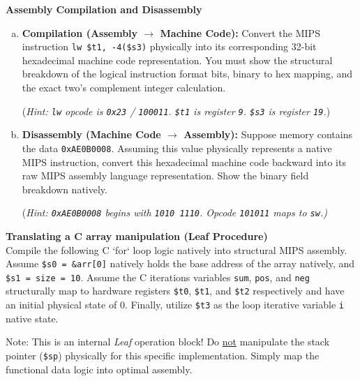 \documentclass[letterpaper]{report}
\begin{document}
%
 {\bf Assembly Compilation and Disassembly}
\begin{enumerate}[(a)]
    \item \textbf{Compilation (Assembly $\rightarrow$ Machine Code):} Convert the MIPS instruction \texttt{lw \$t1, -4(\$s3)} physically into its corresponding 32-bit hexadecimal machine code representation. You must show the structural breakdown of the logical instruction format bits, binary to hex mapping, and the exact two's complement integer calculation.
    
    (\textit{Hint: \texttt{lw} opcode is \texttt{0x23} / \texttt{100011}. \texttt{\$t1} is register \texttt{9}. \texttt{\$s3} is register \texttt{19}.})
    \vspace{4.0in}

    \item \textbf{Disassembly (Machine Code $\rightarrow$ Assembly):} Suppose memory contains the data \texttt{0xAE0B0008}. Assuming this value physically represents a native MIPS instruction, convert this hexadecimal machine code backward into its raw MIPS assembly language representation. Show the binary field breakdown natively.
    
    (\textit{Hint: \texttt{0xAE0B0008} begins with \texttt{1010 1110}. Opcode \texttt{101011} maps to \texttt{sw}.)}
\end{enumerate}
\ep
\vf
\newpage

%
 {\bf Translating a C array manipulation (Leaf Procedure)} \\
Compile the following C `for` loop logic natively into structural MIPS assembly. Assume \texttt{\$s0 = \&arr[0]} natively holds the base address of the array natively, and \texttt{\$s1 = size = 10}. Assume the C iterations variables \texttt{sum}, \texttt{pos}, and \texttt{neg} structurally map to hardware registers \texttt{\$t0}, \texttt{\$t1}, and \texttt{\$t2} respectively and have an initial physical state of $0$. Finally, utilize \texttt{\$t3} as the loop iterative variable \texttt{i} native state.

Note: This is an internal \textit{Leaf} operation block! Do \underline{not} manipulate the stack pointer (\texttt{\$sp}) physically for this specific implementation. Simply map the functional data logic into optimal assembly.
\end{document}
